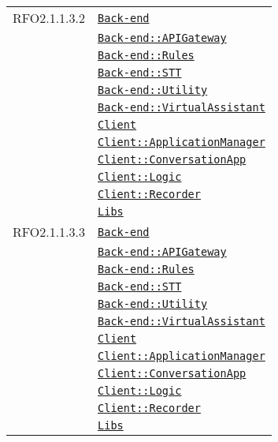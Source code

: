 \begin{longtable}{|>{\centering}m{3cm}|m{10cm}<{\centering}|}
RFO2.1.1.3.2 & \hyperref[Back-end]{\texttt{Back-end}}\\
& \hyperref[Back-end::APIGateway]{\texttt{Back-end::APIGateway}}\\
& \hyperref[Back-end::Rules]{\texttt{Back-end::Rules}}\\
& \hyperref[Back-end::STT]{\texttt{Back-end::STT}}\\
& \hyperref[Back-end::Utility]{\texttt{Back-end::Utility}}\\
& \hyperref[Back-end::VirtualAssistant]{\texttt{Back-end::VirtualAssistant}}\\
& \hyperref[Client]{\texttt{Client}}\\
& \hyperref[Client::ApplicationManager]{\texttt{Client::ApplicationManager}}\\
& \hyperref[Client::ConversationApp]{\texttt{Client::ConversationApp}}\\
& \hyperref[Client::Logic]{\texttt{Client::Logic}}\\
& \hyperref[Client::Recorder]{\texttt{Client::Recorder}}\\
& \hyperref[Libs]{\texttt{Libs}}\\ \hline

RFO2.1.1.3.3 & \hyperref[Back-end]{\texttt{Back-end}}\\
& \hyperref[Back-end::APIGateway]{\texttt{Back-end::APIGateway}}\\
& \hyperref[Back-end::Rules]{\texttt{Back-end::Rules}}\\
& \hyperref[Back-end::STT]{\texttt{Back-end::STT}}\\
& \hyperref[Back-end::Utility]{\texttt{Back-end::Utility}}\\
& \hyperref[Back-end::VirtualAssistant]{\texttt{Back-end::VirtualAssistant}}\\
& \hyperref[Client]{\texttt{Client}}\\
& \hyperref[Client::ApplicationManager]{\texttt{Client::ApplicationManager}}\\
& \hyperref[Client::ConversationApp]{\texttt{Client::ConversationApp}}\\
& \hyperref[Client::Logic]{\texttt{Client::Logic}}\\
& \hyperref[Client::Recorder]{\texttt{Client::Recorder}}\\
& \hyperref[Libs]{\texttt{Libs}}\\ \hline


\end{longtable}
